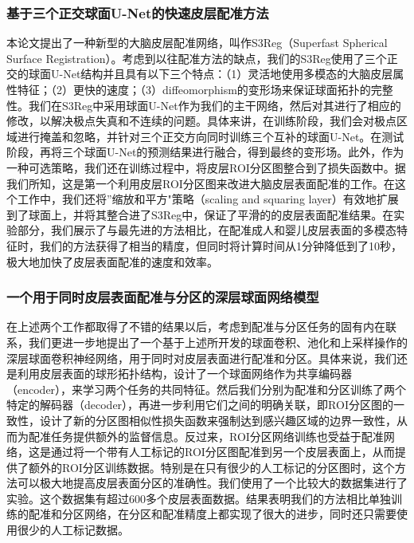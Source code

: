 \subsubsection{基于三个正交球面U-Net的快速皮层配准方法}
本论文提出了一种新型的大脑皮层配准网络，叫作S3Reg（Superfast Spherical Surface Registration）。考虑到以往配准方法的缺点，我们的S3Reg使用了三个正交的球面U-Net结构并且具有以下三个特点：（1）灵活地使用多模态的大脑皮层属性特征；（2）更快的速度；（3）diffeomorphism的变形场来保证球面拓扑的完整性。我们在S3Reg中采用球面U-Net作为我们的主干网络，然后对其进行了相应的修改，以解决极点失真和不连续的问题。具体来讲，在训练阶段，我们会对极点区域进行掩盖和忽略，并针对三个正交方向同时训练三个互补的球面U-Net。在测试阶段，再将三个球面U-Net的预测结果进行融合，得到最终的变形场。此外，作为一种可选策略，我们还在训练过程中，将皮层ROI分区图整合到了损失函数中。据我们所知，这是第一个利用皮层ROI分区图来改进大脑皮层表面配准的工作。在这个工作中，我们还将”缩放和平方"策略（scaling and squaring layer）有效地扩展到了球面上，并将其整合进了S3Reg中，保证了平滑的的皮层表面配准结果。在实验部分，我们展示了与最先进的方法相比，在配准成人和婴儿皮层表面的多模态特征时，我们的方法获得了相当的精度，但同时将计算时间从1分钟降低到了10秒，极大地加快了皮层表面配准的速度和效率。

\subsubsection{一个用于同时皮层表面配准与分区的深层球面网络模型}
在上述两个工作都取得了不错的结果以后，考虑到配准与分区任务的固有内在联系，我们更进一步地提出了一个基于上述所开发的球面卷积、池化和上采样操作的深层球面卷积神经网络，用于同时对皮层表面进行配准和分区。具体来说，我们还是利用皮层表面的球形拓扑结构，设计了一个球面网络作为共享编码器（encoder），来学习两个任务的共同特征。然后我们分别为配准和分区训练了两个特定的解码器（decoder），再进一步利用它们之间的明确关联，即ROI分区图的一致性，设计了新的分区图相似性损失函数来强制达到感兴趣区域的边界一致性，从而为配准任务提供额外的监督信息。反过来，ROI分区网络训练也受益于配准网络，这是通过将一个带有人工标记的ROI分区图配准到另一个皮层表面上，从而提供了额外的ROI分区训练数据。特别是在只有很少的人工标记的分区图时，这个方法可以极大地提高皮层表面分区的准确性。我们使用了一个比较大的数据集进行了实验。这个数据集有超过600多个皮层表面数据。结果表明我们的方法相比单独训练的配准和分区网络，在分区和配准精度上都实现了很大的进步，同时还只需要使用很少的人工标记数据。

